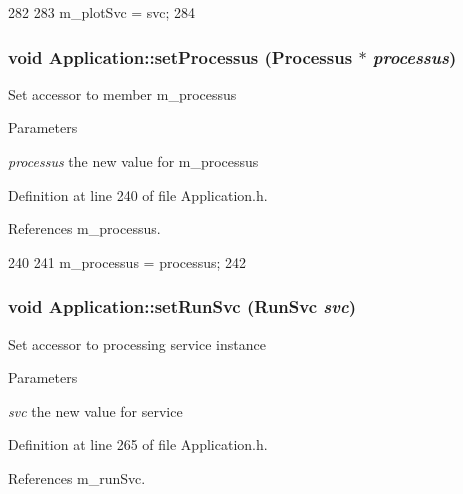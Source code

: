 \begin{DoxyCode}
282                                  {
283     m_plotSvc = svc;
284   }
\end{DoxyCode}
\hypertarget{classApplication_a8ed8a66653bb6e665e05a735519c5d5b}{
\subsubsection[{setProcessus}]{\setlength{\rightskip}{0pt plus 5cm}void Application::setProcessus ({\bf Processus} $\ast$ {\em processus})}}
\label{classApplication_a8ed8a66653bb6e665e05a735519c5d5b}
Set accessor to member m\_\-processus 
\begin{DoxyParams}{Parameters}
\item[{\em processus}]the new value for m\_\-processus \end{DoxyParams}


Definition at line 240 of file Application.h.

References m\_\-processus.


\begin{DoxyCode}
240                                            {
241     m_processus = processus;
242   }
\end{DoxyCode}
\hypertarget{classApplication_a95ea0ef35377c259687752aedc4b9321}{
\subsubsection[{setRunSvc}]{\setlength{\rightskip}{0pt plus 5cm}void Application::setRunSvc ({\bf RunSvc} {\em svc})}}
\label{classApplication_a95ea0ef35377c259687752aedc4b9321}
Set accessor to processing service instance 
\begin{DoxyParams}{Parameters}
\item[{\em svc}]the new value for service \end{DoxyParams}


Definition at line 265 of file Application.h.

References m\_\-runSvc.


